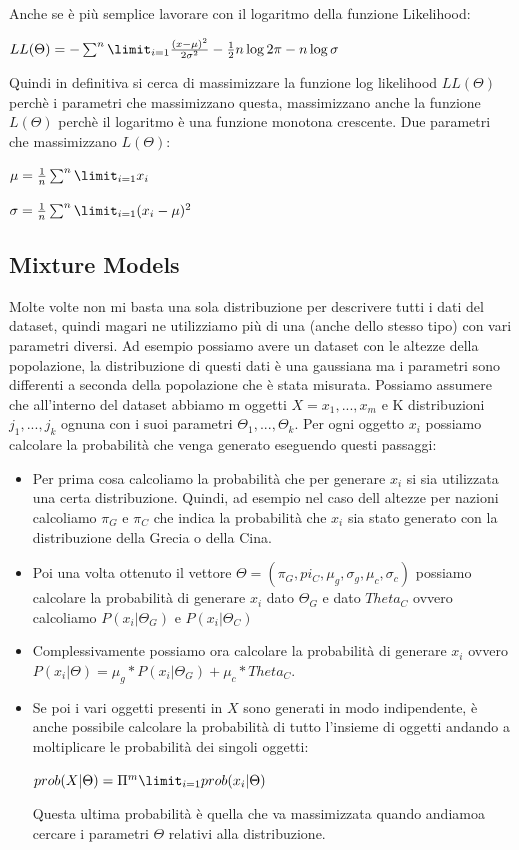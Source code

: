 \documentclass[14pt]{extreport}
\begin{document}
Anche se è più semplice lavorare con il logaritmo della funzione Likelihood:

\centerline{$LL(\Theta) = - \sum^n \limit_{i=1} \frac{(x-\mu)^2}{2\sigma^2} - \frac{1}{2}n\log2\pi - n\log\sigma$}

Quindi in definitiva si cerca di massimizzare la funzione log likelihood $LL(\Theta)$ perchè i parametri che massimizzano questa, massimizzano anche la funzione $L(\Theta)$ perchè il logaritmo è una funzione monotona crescente.
Due parametri che massimizzano $L(\Theta)$:
\newline
\centerline{$\mu = \frac{1}{n}\sum^n \limit_{i=1} x_i $}

\newline
\centerline{$\sigma = \frac{1}{n}\sum^n \limit_{i=1} (x_i-\mu)^2 $}

\subsection{Mixture Models}

Molte volte non mi basta una sola distribuzione per descrivere tutti i dati del dataset, quindi magari ne utilizziamo più di una (anche dello stesso tipo) con vari parametri diversi.
Ad esempio possiamo avere un dataset con le altezze della popolazione, la distribuzione di questi dati è una gaussiana ma i parametri sono differenti a seconda della popolazione che è stata misurata.
Possiamo assumere che all'interno del dataset abbiamo m oggetti $X={x_1,..., x_m}$ e K distribuzioni $j_1,...,j_k$ ognuna con i suoi parametri $\Theta_1,..., \Theta_k$.
Per ogni oggetto $x_i$ possiamo calcolare la probabilità che venga generato eseguendo questi passaggi:

\begin{itemize}
    \item Per prima cosa calcoliamo la probabilità che per generare $x_i$ si sia utilizzata una certa distribuzione. Quindi, ad esempio nel caso dell altezze per nazioni calcoliamo $\pi_G$ e $\pi_C$ che indica la probabilità che $x_i$ sia stato generato con la distribuzione della Grecia o della Cina.
    \item Poi una volta ottenuto il vettore $\Theta=(\pi_G,pi_C, \mu_g,\sigma_g,\mu_c, \sigma_c)$ possiamo calcolare la probabilità di generare $x_i$ dato $\Theta_G$ e dato $Theta_C$ ovvero calcoliamo $P(x_i|\Theta_G)$ e $P(x_i|\Theta_C)$
    \item Complessivamente possiamo ora calcolare la probabilità di generare $x_i$ ovvero $P(x_i|\Theta)=\mu_g*P(x_i|\Theta_G) + \mu_c*Theta_C$.
    \item Se poi i vari oggetti presenti in $X$ sono generati in modo indipendente, è anche possibile calcolare la probabilità di tutto l'insieme di oggetti andando a moltiplicare le probabilità dei singoli oggetti:
    \newline
    \centerline{$prob(X|\Theta) = \Pi^m \limit_{i=1} prob(x_i|\Theta)$}
    Questa ultima probabilità è quella che va massimizzata quando andiamoa cercare i parametri $\Theta$ relativi alla distribuzione.
\end{itemize}
\end{document}
